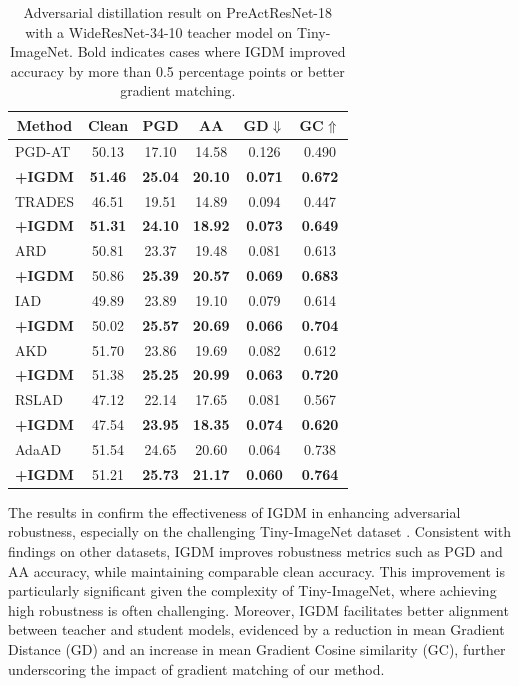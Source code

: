 \documentclass{article} %
\begin{document}
\begin{table}[h]
 \centering
\caption{Adversarial distillation result on PreActResNet-18 with a WideResNet-34-10 teacher model on Tiny-ImageNet. Bold indicates cases where IGDM improved accuracy by more than 0.5 percentage points or better gradient matching.}
 \setlength{\tabcolsep}{13.5pt}
 \begin{tabular}{lccccc}
 \toprule
 \multicolumn{1}{c}{Method} & Clean & PGD & AA & GD$\Downarrow$ & GC$\Uparrow$  \\
\midrule
PGD-AT \citep{PGD}& 50.13 & 17.10 & 14.58 & 0.126 & 0.490 \\
\textbf{+IGDM} & \textbf{51.46} & \textbf{25.04} & \textbf{20.10} & \textbf{0.071} & \textbf{0.672} \\
\midrule
TRADES \citep{TRADES}& 46.51 & 19.51 & 14.89 & 0.094 & 0.447 \\
\textbf{+IGDM} & \textbf{51.31} & \textbf{24.10} & \textbf{18.92} & \textbf{0.073} & \textbf{0.649} \\
\midrule
ARD \citep{ard}& 50.81 & 23.37 & 19.48 & 0.081 & 0.613 \\
\textbf{+IGDM} & 50.86 & \textbf{25.39} & \textbf{20.57} & \textbf{0.069} & \textbf{0.683} \\
\midrule
IAD \citep{iad}& 49.89 & 23.89 & 19.10 & 0.079 & 0.614 \\
\textbf{+IGDM} & 50.02 & \textbf{25.57} & \textbf{20.69} & \textbf{0.066} & \textbf{0.704} \\
\midrule
AKD \citep{akd}& 51.70& 23.86& 19.69& 0.082& 0.612\\
\textbf{+IGDM} & 51.38& \textbf{25.25}& \textbf{20.99}& \textbf{0.063}& \textbf{0.720}\\
 \midrule
RSLAD \citep{rslad}& 47.12 & 22.14 & 17.65 & 0.081 & 0.567 \\
\textbf{+IGDM} & 47.54 & \textbf{23.95} & \textbf{18.35} & \textbf{0.074} & \textbf{0.620} \\
\midrule
AdaAD \citep{adaad}& 51.54 & 24.65 & 20.60 & 0.064 & 0.738 \\
\textbf{+IGDM} & 51.21 & \textbf{25.73} & \textbf{21.17} & \textbf{0.060} & \textbf{0.764} \\
\bottomrule
 \end{tabular}

 \label{tab:Tiny}
\end{table}
The results in  confirm the effectiveness of IGDM in enhancing adversarial robustness, especially on the challenging Tiny-ImageNet dataset \cite{le2015tiny}. 
Consistent with findings on other datasets, IGDM improves robustness metrics such as PGD and AA accuracy, while maintaining comparable clean accuracy. This improvement is particularly significant given the complexity of Tiny-ImageNet, where achieving high robustness is often challenging. 
Moreover, IGDM facilitates better alignment between teacher and student models, evidenced by a reduction in mean Gradient Distance (GD) and an increase in mean Gradient Cosine similarity (GC), further underscoring the impact of gradient matching of our method.
\end{document}
